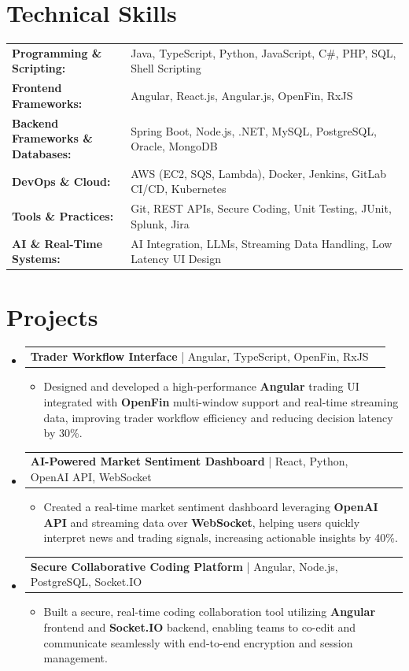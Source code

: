 \documentclass[letterpaper,10pt]{article}
\makeatletter
\newcommand{\resumeItem}[1]{
  \item{\fontsize{8pt}{9pt}\selectfont
    #1 \vspace{-3pt}
  }
}
\newcommand{\resumeProjectHeading}[2]{
    \item
    \begin{tabular*}{1.001\textwidth}{l@{\extracolsep{\fill}}r}
      \fontsize{8.5pt}{10pt}#1 & \textbf{\fontsize{8.5pt}{10pt} #2}\\
    \end{tabular*}\vspace{-7pt}
}
\newcommand{\resumeSubHeadingListStart}{\begin{itemize}[leftmargin=0pt, label={}]}
\newcommand{\resumeSubHeadingListEnd}{\end{itemize}}
\newcommand{\resumeItemListStart}{\begin{itemize}[leftmargin=*]}
\newcommand{\resumeItemListEnd}{\end{itemize}\vspace{-5pt}}
\makeatother
\begin{document}
\section{Technical Skills}
        \vspace{-14pt}
        \begin{table}[h]
            \fontsize{8pt}{9pt}\selectfont
            \begin{tabular}{p{0.3\linewidth} p{0.7\linewidth}}
                \textbf{Programming \& Scripting:} & Java, TypeScript, Python, JavaScript, C\#, PHP, SQL, Shell Scripting \\
                \textbf{Frontend Frameworks:} & Angular, React.js, Angular.js, OpenFin, RxJS \\
                \textbf{Backend Frameworks \& Databases:} & Spring Boot, Node.js, .NET, MySQL, PostgreSQL, Oracle, MongoDB \\
                \textbf{DevOps \& Cloud:} & AWS (EC2, SQS, Lambda), Docker, Jenkins, GitLab CI/CD, Kubernetes \\
                \textbf{Tools \& Practices:} & Git, REST APIs, Secure Coding, Unit Testing, JUnit, Splunk, Jira \\
                \textbf{AI \& Real-Time Systems:} & AI Integration, LLMs, Streaming Data Handling, Low Latency UI Design \\
            \end{tabular}
        \end{table}
 \vspace{-18pt}

\section{Projects}
    \vspace{-5pt}
    \resumeSubHeadingListStart
          \resumeProjectHeading
            {\textbf{Trader Workflow Interface} | Angular, TypeScript, OpenFin, RxJS}{}
            \resumeItemListStart
                \resumeItem{Designed and developed a high-performance \textbf{Angular} trading UI integrated with \textbf{OpenFin} multi-window support and real-time streaming data, improving trader workflow efficiency and reducing decision latency by 30\%.}
            \resumeItemListEnd
        \vspace{-12pt}
    
        \resumeProjectHeading
            {\textbf{AI-Powered Market Sentiment Dashboard} | React, Python, OpenAI API, WebSocket}{}
        \resumeItemListStart
                \resumeItem{Created a real-time market sentiment dashboard leveraging \textbf{OpenAI API} and streaming data over \textbf{WebSocket}, helping users quickly interpret news and trading signals, increasing actionable insights by 40\%.}
        \resumeItemListEnd
      \vspace{-12pt}
      \resumeProjectHeading
        {\textbf{Secure Collaborative Coding Platform} | Angular, Node.js, PostgreSQL, Socket.IO}{}
    \resumeItemListStart
            \resumeItem{Built a secure, real-time coding collaboration tool utilizing \textbf{Angular} frontend and \textbf{Socket.IO} backend, enabling teams to co-edit and communicate seamlessly with end-to-end encryption and session management.}
    \resumeItemListEnd
    \resumeSubHeadingListEnd
\end{document}
